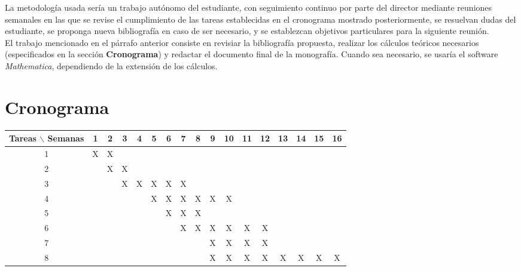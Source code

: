 \documentclass[prb,aps,preprintnumbers,amsmath,amssymb]{article}
\begin{document}
La metodología usada sería un trabajo autónomo del estudiante, con seguimiento continuo por parte del director mediante reuniones semanales en las que se revise el cumplimiento de las tareas establecidas en el cronograma mostrado posteriormente, se resuelvan dudas del estudiante, se proponga nueva bibliografía en caso de ser necesario, y se establezcan objetivos particulares para la siguiente reunión.\\

El trabajo mencionado en el párrafo anterior consiste en revisiar la bibliografía propuesta, realizar los cálculos teóricos necesarios (especificados en la sección \textbf{Cronograma}) y redactar el documento final de la monografía. Cuando sea necesario, se usaría el software \emph{Mathematica}, dependiendo de la extensión de los cálculos.

\section{\label{crono}Cronograma}

\begin{table}[htb]
\centering
	\begin{tabular}{|c|cccccccccccccccc| }
	\hline
	Tareas $\backslash$ Semanas & 1 & 2 & 3 & 4 & 5 & 6 & 7 & 8 & 9 & 10 & 11 & 12 & 13 & 14 & 15 & 16  \\
	\hline
	1 & X & X &   &   &   &   &   &  &  &   &   &   &   &   &   &   \\
	2 &   & X & X &   &  &  &  &   &   &  &  &  &   &  &  &   \\
	3 &   &   & X & X &  X & X  & X &  &   &   &   &  &   &   &  &   \\
	4 &   &   &   &   & X & X & X & X & X & X &   &   &   &   &   &   \\
	5 &   &   &   &   &  &  X & X  & X  &  &   &   &  &   &   &  &   \\
	6 &   &   &   &   &  &   & X  & X  & X & X  & X  & X &   &   &  &   \\
	7 &   &   &   &   &  &   &   &   & X & X  & X  & X &   &   &  &   \\
	8 &   &   &   &   &  &   &   &   & X &  X & X  & X & X  & X  & X & X  \\
	\hline
	\end{tabular}
\end{table}
\vspace{1mm}
\end{document}
